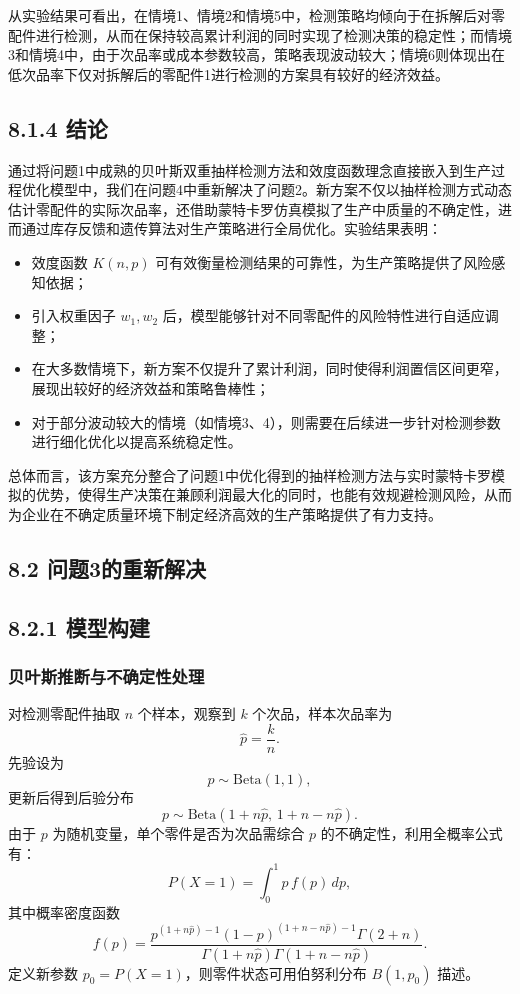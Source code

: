 \documentclass{article}
\begin{document}
	从实验结果可看出，在情境1、情境2和情境5中，检测策略均倾向于在拆解后对零配件进行检测，从而在保持较高累计利润的同时实现了检测决策的稳定性；而情境3和情境4中，由于次品率或成本参数较高，策略表现波动较大；情境6则体现出在低次品率下仅对拆解后的零配件1进行检测的方案具有较好的经济效益。
	
	\subsection*{8.1.4 结论}
	
	通过将问题1中成熟的贝叶斯双重抽样检测方法和效度函数理念直接嵌入到生产过程优化模型中，我们在问题4中重新解决了问题2。新方案不仅以抽样检测方式动态估计零配件的实际次品率，还借助蒙特卡罗仿真模拟了生产中质量的不确定性，进而通过库存反馈和遗传算法对生产策略进行全局优化。实验结果表明：
	\begin{itemize}
		\item 效度函数 $K(n,p)$ 可有效衡量检测结果的可靠性，为生产策略提供了风险感知依据；
		\item 引入权重因子 $w_1, w_2$ 后，模型能够针对不同零配件的风险特性进行自适应调整；
		\item 在大多数情境下，新方案不仅提升了累计利润，同时使得利润置信区间更窄，展现出较好的经济效益和策略鲁棒性；
		\item 对于部分波动较大的情境（如情境3、4），则需要在后续进一步针对检测参数进行细化优化以提高系统稳定性。
	\end{itemize}
	
	总体而言，该方案充分整合了问题1中优化得到的抽样检测方法与实时蒙特卡罗模拟的优势，使得生产决策在兼顾利润最大化的同时，也能有效规避检测风险，从而为企业在不确定质量环境下制定经济高效的生产策略提供了有力支持。
	



	
	
	
	\subsection*{8.2 问题3的重新解决}
	

	
	\subsection*{8.2.1 模型构建}
	
	\subsubsection*{贝叶斯推断与不确定性处理}
	对检测零配件抽取 $n$ 个样本，观察到 $k$ 个次品，样本次品率为
	\[
	\hat{p} = \frac{k}{n}.
	\]
	先验设为
	\[
	p \sim \text{Beta}(1,1),
	\]
	更新后得到后验分布
	\[
	p \sim \text{Beta}(1+n\hat{p},\,1+n-n\hat{p}).
	\]
	由于 $p$ 为随机变量，单个零件是否为次品需综合 $p$ 的不确定性，利用全概率公式有：
	\[
	P(X=1)=\int_{0}^{1} p\, f(p)\,dp,
	\]
	其中概率密度函数
	\[
	f(p)=\frac{p^{(1+n\hat{p})-1}(1-p)^{(1+n-n\hat{p})-1}\Gamma(2+n)}{\Gamma(1+n\hat{p})\Gamma(1+n-n\hat{p})}.
	\]
	定义新参数 $p_0=P(X=1)$，则零件状态可用伯努利分布 $B(1,p_0)$ 描述。
	
\end{document}
